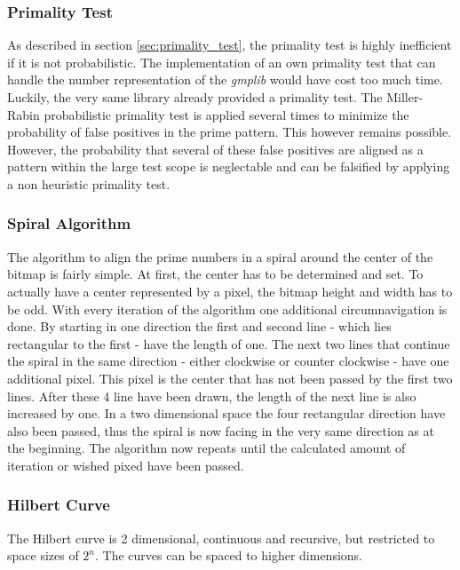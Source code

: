 \subsubsection{Primality Test}
\label{sec:prim_test}
As described in section \ref{sec:primality_test}, the primality test is highly inefficient if it is not probabilistic. The implementation of an own primality test that can handle the number representation of the \emph{gmplib} would have cost too much time. Luckily, the very same library already provided a primality test. The Miller-Rabin probabilistic primality test is applied several times to minimize the probability of false positives in the prime pattern. This however remains possible. However, the probability that several of these false positives are aligned as a pattern within the large test scope is neglectable and can be falsified by applying a non heuristic primality test.

\subsubsection{Spiral Algorithm}
The algorithm to align the prime numbers in a spiral around the center of the bitmap is fairly simple. At first, the center has to be determined and set. To actually have a center represented by a pixel, the bitmap height and width has to be odd. With every iteration of the algorithm one additional circumnavigation is done. By starting in one direction the first and second line - which lies rectangular to the first - have the length of one. The next two lines that continue the spiral in the same direction - either clockwise or counter clockwise - have one additional pixel. This pixel is the center that has not been passed by the first two lines. After these 4 line have been drawn, the length of the next line is also increased by one. In a two dimensional space the four rectangular direction have also been passed, thus the spiral is now facing in the very same direction as at the beginning. The algorithm now repeats until the calculated amount of iteration or wished pixed have been passed.

\subsubsection{Hilbert Curve}
The Hilbert curve is 2 dimensional, continuous and recursive, but restricted to space sizes of $2^{n}$. The curves can be spaced to higher dimensions.

